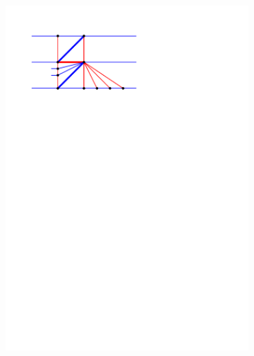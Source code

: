 \begin{figure}[!b]
\begin{subfigure}[t]{0.23 \textwidth}
        \includegraphics[width =\textwidth]{topFanFlips/img/newFlip/aBigAfter}
    \end{subfigure}
    \quad 
    \begin{subfigure}[t]{0.23 \textwidth}

\end{subfigure}
\end{figure}
